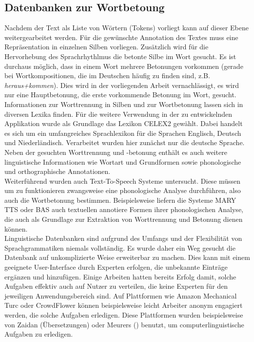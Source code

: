 \subsection{Datenbanken zur Wortbetoung}
Nachdem der Text als Liste von Wörtern (Tokens) vorliegt kann auf dieser Ebene weitergearbeitet werden. Für die gewünschte Annotation des Textes muss eine Repräsentation in einzelnen Silben vorliegen. Zusätzlich wird für die Hervorhebung des Sprachrhythlmus die betonte Silbe im Wort gesucht. Es ist durchaus möglich, dass in einem Wort mehrere Betonungen vorkommen (gerade bei Wortkompositionen, die im Deutschen häufig zu finden sind, z.B. \textit{heraus+kommen}). Dies wird in der vorliegenden Arbeit vernachlässigt, es wird nur eine Hauptbetonung, die erste vorkommende Betonung im Wort, gesucht.\\
Informationen zur Worttrennung in Silben und zur Wortbetonung lassen sich in diversen Lexika finden. Für die weitere Verwendung in der zu entwickelnden Applikation wurde als Grundlage das Lexikon CELEX2 gewählt. Dabei handelt es sich um ein umfangreiches Sprachlexikon für die Sprachen Englisch, Deutsch und Niederländisch. Verarbeitet wurden hier zunächst nur die deutsche Sprache. Neben der gesuchten Worttrennung und -betonung enthält es auch weitere linguistische Informationen wie Wortart und Grundformen sowie phonologische und orthographische Annotationen.
\\
Weiterführend wurden auch Text-To-Speech Systeme untersucht. Diese müssen um zu funktionieren zwangsweise eine phonologische Analyse durchführen, also auch die Wortbetonung bestimmen. Beispielsweise liefern die Systeme MARY TTS oder BAS auch textuellen annotiere Formen ihrer phonologischen Analyse, die auch als Grundlage zur Extraktion von Worttrennung und Betonung dienen können.\\

Linguistische Datenbanken sind aufgrund des Umfangs und der Flexibilität von Sprachgrammatiken niemals vollständig. Es wurde daher ein Weg gesucht die Datenbank auf unkomplizierte Weise erweiterbar zu machen. Dies kann mit einem geeignete User-Interface durch Experten erfolgen, die unbekannte Einträge ergänzen und hinzufügen. Einige Arbeiten hatten bereits Erfolg damit, solche Aufgaben effektiv auch auf Nutzer zu verteilen, die keine Experten für den jeweiligen Anwendungsbereich sind. Auf Plattformen wie Amazon Mechanical Turc oder CrowdFlower können beispielsweise leicht Arbeiter anonym engagiert werden, die solche Aufgaben erledigen\cite{Snow2008}. Diese Plattformen wurden beispielsweise von Zaidan (Übersetzungen)\cite{Zaidan2011} oder Meurers\cite{Meurers2015} () benutzt, um computerlinguistische Aufgaben zu erledigen.